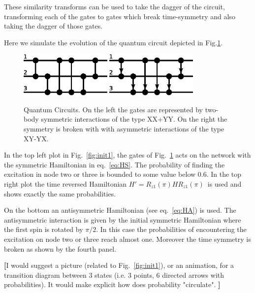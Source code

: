 \documentclass[aps,pra,12pt,nofootinbib,superscriptaddress,longbibliography,showpacs]{revtex4-1}
\newcommand{\yo}[1]{\textcolor{dblue}{\textbf{[}#1\textbf{]}}}
\theoremstyle{plain}
\theoremstyle{definition}
\begin{document}
These similarity transforms can be used to take the dagger of the circuit, transforming each of the gates to gates which break time-symmetry and also taking the dagger of those gates.  




Here we simulate the evolution of the quantum circuit depicted in
Fig.\ref{fig:qcircuit}.

\begin{figure}[h]
  \centering
  \includegraphics[width=0.4\textwidth]{gates1}
  \hfill
  \includegraphics[width=0.4\textwidth]{gates2}
  \caption{Quantum Circuits.
  On the left the gates are represented by two-body symmetric interactions of
  the type XX+YY.
  On the right the symmetry is broken with with asymmetric interactions of the
  type XY-YX.}
  \label{fig:qcircuit}
\end{figure}

In the top left plot in Fig.~\ref{fig:init1},
the gates of Fig.~\ref{fig:qcircuit} acts on the network with the symmetric
Hamiltonian in eq.~\ref{eq:HS}.
The probability of finding the excitation in node two or three is bounded to
some value below 0.6.
In the top right plot the time reversed Hamiltonian
$H'=R_{z1}(\pi)HR_{z1}(\pi)$~is used and shows exactly the same
probabilities.

On the bottom an antisymmetric Hamiltonian (see eq.~\ref{eq:HA}) is used. 
The antisymmetric interaction is given by the initial symmetric Hamiltonian
where the first spin is rotated by $\pi/2$.
In this case the probabilities of encountering the excitation on node two or
three reach almost one.
Moreover the time symmetry is broken as shown by the fourth panel.

\yo{I would suggest a picture (related to Fig.~\ref{fig:init1}), or an animation,
for a transition diagram between 3 states
(i.e. 3 points, 6 directed arrows with probabilities).
It would make explicit how does probability "circulate". }
\end{document}
